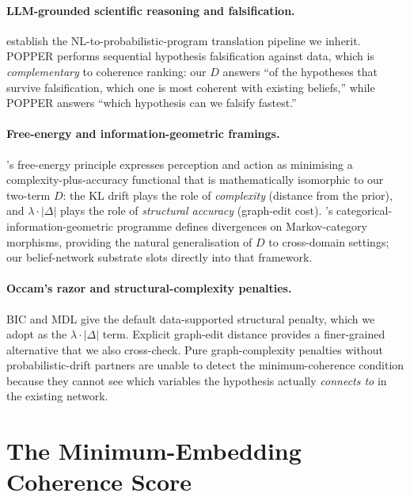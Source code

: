 \documentclass{article}
\begin{document}
\paragraph{LLM-grounded scientific reasoning and falsification.}
\citet{wong2023wordmodels} establish the NL-to-probabilistic-program
translation pipeline we inherit. POPPER
\citep{huang2025popperllm} performs sequential hypothesis falsification
against data, which is \emph{complementary} to coherence ranking: our
$D$ answers ``of the hypotheses that survive falsification, which one
is most coherent with existing beliefs,'' while POPPER answers ``which
hypothesis can we falsify fastest.''

\paragraph{Free-energy and information-geometric framings.}
\citet{friston2010free}'s free-energy principle expresses perception
and action as minimising a complexity-plus-accuracy functional that is
mathematically isomorphic to our two-term $D$: the KL drift plays the
role of \emph{complexity} (distance from the prior), and
$\lambda \cdot |\Delta|$ plays the role of
\emph{structural accuracy} (graph-edit cost).
\citet{perrone2024catinfogeom}'s categorical-information-geometric
programme defines divergences on Markov-category morphisms, providing
the natural generalisation of $D$ to cross-domain settings; our
belief-network substrate slots directly into that framework.

\paragraph{Occam's razor and structural-complexity penalties.} BIC
\citep{schwarz1978} and MDL
\citep{rissanen1978modelingShortestDescription, grunwald2007mdl} give
the default data-supported structural penalty, which we adopt as the
$\lambda \cdot |\Delta|$ term. Explicit graph-edit distance
\citep{gao2010surveygraphedit} provides a finer-grained alternative
that we also cross-check. Pure graph-complexity penalties without
probabilistic-drift partners are unable to detect the minimum-coherence
condition because they cannot see which variables the hypothesis
actually \emph{connects to} in the existing network.

\section{The Minimum-Embedding Coherence Score}
\label{sec:formulation}
\end{document}
